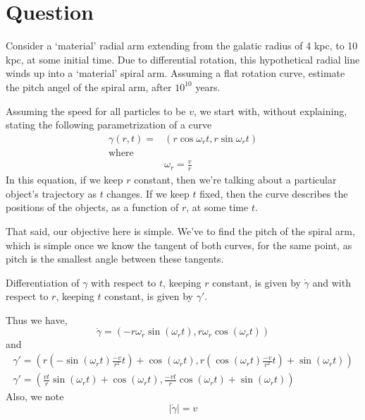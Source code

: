 \documentclass[paper=a4, fontsize=11pt]{scrartcl} %
\numberwithin{equation}{section} %
\numberwithin{figure}{section} %
\numberwithin{table}{section} %
\begin{document}
\section{Question}
	Consider a `material' radial arm extending from the galatic radius of 4 kpc, to 10 kpc, at some initial time. Due to differential rotation, this hypothetical radial line winds up into a `material' spiral arm. Assuming a flat rotation curve, estimate the pitch angel of the spiral arm, after $10^{10}$ years.\\
	\par
	Assuming the speed for all particles to be $v$, we start with, without explaining, stating the following parametrization of a curve
	\begin{equation}
	\begin{split}
		\gamma(r,t) = & (r\cos{\omega_r t}, r\sin{\omega_r t}) \\
		\text{where}\\
		& \omega_r = \frac{v}{r}
	\end{split}
	\end{equation}
	In this equation, if we keep $r$ constant, then we're talking about a particular object's trajectory as $t$ changes. If we keep $t$ fixed, then the curve describes the positions of the objects, as a function of $r$, at some time $t$.
	\par
	That said, our objective here is simple. We've to find the pitch of the spiral arm, which is simple once we know the tangent of both curves, for the same point, as pitch is the smallest angle between these tangents.
	\par
	Differentiation of $\gamma$ with respect to $t$, keeping $r$ constant, is given by $\dot \gamma$ and with respect to $r$, keeping $t$ constant, is given by $\gamma'$.
	\par
	Thus we have,
	\begin{equation}
		\dot \gamma = (-r\omega_r\sin(\omega_rt), r\omega_r\cos(\omega_rt))
	\end{equation}
	and
	\begin{equation}	
	\begin{split}
		\gamma' = (r ( -\sin(\omega_rt)\frac{-v}{r^2}t) + \cos(\omega_r t), r (\cos(\omega_rt)\frac{-v}{r^2}t) + \sin(\omega_rt)) \\	
		\gamma' = ( \frac{vt}{r} \sin(\omega_r t) + \cos(\omega_rt), \frac{-vt}{r} \cos(\omega_rt) + \sin(\omega_rt) )
	\end{split}
	\end{equation}
	Also, we note
	\begin{equation}
		\left|{\dot \gamma}\right| = v
	\end{equation}
\end{document}
